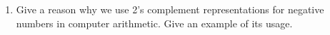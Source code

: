 \documentclass[11pt]{article}
\begin{document}
\begin{enumerate}
    \item Give a reason why we use 2's complement representations for negative numbers in computer
    arithmetic. Give an example of its usage.
    
\end{enumerate}
\end{document}
